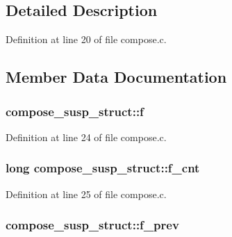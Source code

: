 \subsection{Detailed Description}


Definition at line 20 of file compose.\+c.



\subsection{Member Data Documentation}
\subsubsection[{\texorpdfstring{f}{f}}]{ compose\+\_\+susp\+\_\+struct\+::f}\hypertarget{structcompose__susp__struct_ad5eff317454998fc1f0fc67b85b511c3}{}\label{structcompose__susp__struct_ad5eff317454998fc1f0fc67b85b511c3}


Definition at line 24 of file compose.\+c.

\subsubsection[{\texorpdfstring{f\+\_\+cnt}{f_cnt}}]{\setlength{\rightskip}{0pt plus 5cm}long compose\+\_\+susp\+\_\+struct\+::f\+\_\+cnt}\hypertarget{structcompose__susp__struct_a876b3e54d43c6842d371c68f733e3031}{}\label{structcompose__susp__struct_a876b3e54d43c6842d371c68f733e3031}


Definition at line 25 of file compose.\+c.

\subsubsection[{\texorpdfstring{f\+\_\+prev}{f_prev}}]{ compose\+\_\+susp\+\_\+struct\+::f\+\_\+prev}\hypertarget{structcompose__susp__struct_ac9bf98ace86771f0f568405b8bd30d13}{}\label{structcompose__susp__struct_ac9bf98ace86771f0f568405b8bd30d13}


